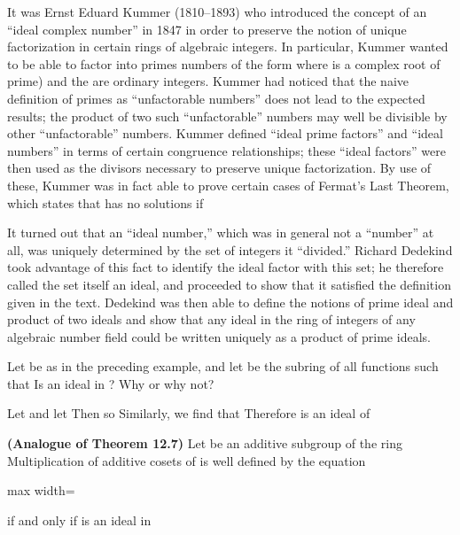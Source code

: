 \documentclass[11pt,oneside]{article}
\begin{document}
\begin{BookBody}
\noindent It was Ernst Eduard Kummer (1810–1893) who introduced the concept of an “ideal complex number” in 1847 in order to preserve the notion of unique factorization in certain rings of algebraic integers. In particular, Kummer wanted to be able to factor into primes numbers of the form  where \BookInline{\alpha } is a complex root of  prime) and the  are ordinary integers. Kummer had noticed that the naive definition of primes as “unfactorable numbers” does not lead to the expected results; the product of two such “unfactorable” numbers may well be divisible by other “unfactorable” numbers. Kummer defined “ideal prime factors” and “ideal numbers” in terms of certain congruence relationships; these “ideal factors” were then used as the divisors necessary to preserve unique factorization. By use of these, Kummer was in fact able to prove certain cases of Fermat’s Last Theorem, which states that  has no solutions  if 

It turned out that an “ideal number,” which was in general not a “number” at all, was uniquely determined by the set of integers it “divided.” Richard Dedekind took advantage of this fact to identify the ideal factor with this set; he therefore called the set itself an ideal, and proceeded to show that it satisfied the definition given in the text. Dedekind was then able to define the notions of prime ideal and product of two ideals and show that any ideal in the ring of integers of any algebraic number field could be written uniquely as a product of prime ideals.

 Let  be as in the preceding example, and let  be the subring of all functions  such that  Is  an ideal in ? Why or why not?

 Let  and let  Then  so  Similarly, we find that  Therefore  is an ideal of \BookEnd{\blacktriangle}

 \textbf{(Analogue of Theorem 12.7)} Let  be an additive subgroup of the ring  Multiplication of additive cosets of  is well defined by the equation

\begin{center}\begin{adjustbox}{max width=\linewidth}\end{adjustbox}\end{center}

\noindent if and only if  is an ideal in 

\end{BookBody}
\end{document}

